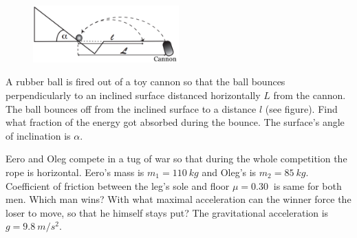 \documentclass[11pt]{article}
\begin{document}
\probeng
\begin{figure}
  \vspace{-20pt}
  \begin{center}
    \includegraphics[width=0.5\textwidth]{2016-lahg-01-kaldjoonis_ing}
  \end{center}
  \vspace{-30pt}
\end{figure}
A rubber ball is fired out of a toy cannon so that the ball bounces perpendicularly to an inclined surface distanced horizontally $L$ from the cannon. The ball bounces off from the inclined surface to a distance $l$ (see figure). Find what fraction of the energy got absorbed during the bounce. The surface’s angle of inclination is $\alpha$.
\probend
\bigskip


\probeng
Eero and Oleg compete in a tug of war so that during the whole competition the rope is horizontal. Eero’s mass is $m_1=\SI{110}{kg}$ and Oleg’s is $m_2=\SI{85}{kg}$. Coefficient of friction between the leg’s sole and floor $\mu=\SI{0,30}{}$ is same for both men. Which man wins? With what maximal acceleration can the winner force the loser to move, so that he himself stays put? The gravitational acceleration is $g=\SI{9,8}{m/s^2}$.
\probend
\bigskip

\end{document}
